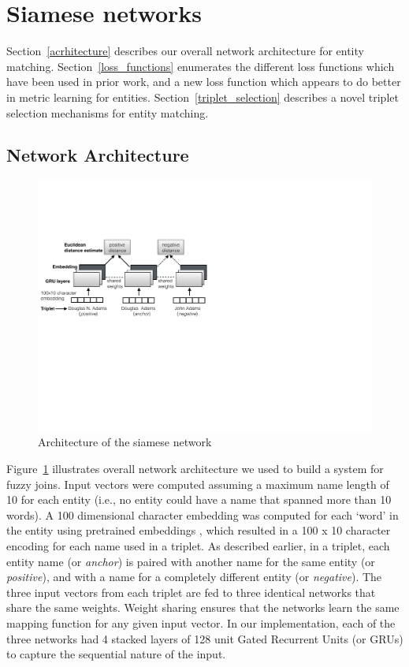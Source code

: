 \section{Siamese networks}
\label{siamese networks}

Section~\ref{acrhitecture} describes our overall network architecture for entity matching. Section~\ref{loss_functions} enumerates the different loss functions which have been used in prior work, and a new loss function which appears to do better in metric learning for entities.  Section~\ref{triplet_selection} describes a novel triplet selection mechanisms for entity matching.

\subsection{Network Architecture}
\label{architecture}
\begin{figure}
\includegraphics[width=1.0\linewidth]{triplet_siamese_network}
\caption{Architecture of the siamese network}
\label{siamese_nets}
\end{figure}

Figure~\ref{siamese_nets} illustrates overall network architecture we used to build a system for fuzzy joins.  Input vectors were computed assuming a maximum name length of 10 for each entity (i.e., no entity could have a name that spanned more than 10 words).  A 100 dimensional character embedding was computed for each `word' in the entity using pretrained embeddings \cite{hashimoto-jmt:2017:EMNLP2017}, which resulted in a 100 x 10 character encoding for each name used in a triplet.  As described earlier, in a triplet, each entity name (or \textit{anchor}) is paired with another name for the same entity (or \textit{positive}), and with a name for a completely different entity (or \textit{negative}).  The three input vectors from each triplet are fed to three identical networks that share the same weights.  Weight sharing ensures that the networks learn the same mapping function for any given input vector.  In our implementation, each of the three networks had 4 stacked layers of 128 unit Gated Recurrent Units (or GRUs) to capture the sequential nature of the input.  

